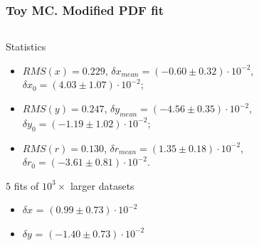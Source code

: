 \documentclass[10 pt,compress,mathserif]{beamer}
\begin{document}
\begin{frame}
 \frametitle{Toy MC. Modified PDF fit}
 \begin{small}
 \begin{columns}
  \begin{column}{0.5\textwidth}
  \begin{block}{Statistics}
  \begin{itemize}
   \item $RMS(x) = 0.229$, $\delta x_{mean}= (-0.60\pm0.32)\cdot10^{-2}$, $\delta x_0 = (4.03\pm1.07)\cdot 10^{-2}$;
   \item $RMS(y) = 0.247$, $\delta y_{mean}= (-4.56\pm0.35)\cdot10^{-2}$, $\delta y_0 = (-1.19\pm1.02)\cdot 10^{-2}$;
   \item $RMS(r) = 0.130$, $\delta r_{mean}= (1.35\pm0.18)\cdot10^{-2}$, $\delta r_0 = (-3.61\pm0.81)\cdot 10^{-2}$.
  \end{itemize}
  \end{block}

  \begin{block}{$5$ fits of $10^3\times$ larger datasets}
   \begin{itemize}
    \item $\delta x$ = $(0.99\pm0.73)\cdot10^{-2}$
    \item $\delta y$ = $(-1.40\pm0.73)\cdot10^{-2}$
   \end{itemize}
  \end{block}
  
  \end{column}
  \begin{column}{0.5\textwidth}
    \begin{center}
    \end{center}
  \end{column}
 \end{columns}
 \end{small}
\end{frame}
\end{document}
